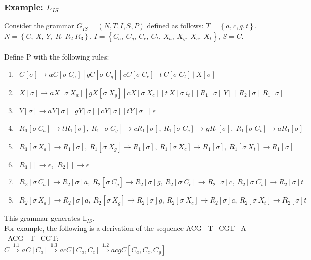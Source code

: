 \documentclass[11pt]{article}
\begin{document}
\subsubsection{Example: $L_{IS}$}
Consider the grammar $G_{IS} = (N, T, I, S, P)$ defined as follows:
$T = \left\{a,c,g,t\right\}$, $N = \left\{C, \ X, \ Y, \ R_1 \ R_2 \ R_3\right\}$, $I = \left\{C_{a}, \ C_{g}, \ C_{c}, \ C_{t}, \ X_{a}, \ X_{g}, \ X_{c}, \ X_{t}\right\}$,
$S = C$. \\ \\
Define P with the following rules:\\
\begin{enumerate}
\item $\ \ C[\sigma] \rightarrow a C[\sigma \ C_a] \ | \ g C[\sigma \ C_g] \ | \ c C[\sigma \ C_c] \ | \ t \ C[\sigma \ C_t] \ | \ X[\sigma]$
\item $\ \ X[\sigma] \rightarrow a X[\sigma \ X_a] \ | \ g X[\sigma \ X_g] \ | \ c X[\sigma \ X_c] \ | \ t \ X[\sigma \ i_t] \ | \ R_1[\sigma] \ Y[] \ R_2[\sigma] \ R_1[\sigma]$
\item $\ \ Y[\sigma] \rightarrow a Y[\sigma] \ | \ g Y[\sigma] \ | \ c Y[\sigma] \ | \ t Y[\sigma] \ | \ \epsilon$
\item $\ \ R_1[\sigma \ C_a] \rightarrow t R_1[\sigma], \ R_1[\sigma \ C_g] \rightarrow c R_1[\sigma], \ R_1[\sigma \ C_c] \rightarrow g R_1[\sigma], \ R_1[\sigma \ C_t] \rightarrow a R_1[\sigma]$
\item $\ \ R_1[\sigma \ X_a] \rightarrow R_1[\sigma], \ R_1[\sigma \ X_g] \rightarrow R_1[\sigma], \ R_1[\sigma \ X_c] \rightarrow R_1[\sigma], \ R_1[\sigma \ X_t] \rightarrow R_1[\sigma]$
\item $\ \ R_1[] \rightarrow \epsilon$, $\ R_2[] \rightarrow \epsilon$
\item $\ \ R_2[\sigma \ C_a] \rightarrow R_2[\sigma] a, \ R_2[\sigma \ C_g] \rightarrow R_2[\sigma] g, \ R_2[\sigma \ C_c] \rightarrow R_2[\sigma] c, \ R_2[\sigma \ C_t] \rightarrow R_2[\sigma] t$
\item $\ \ R_2[\sigma \ X_a] \rightarrow R_2[\sigma] a, \ R_2[\sigma \ X_g] \rightarrow R_2[\sigma] g, \ R_2[\sigma \ X_c] \rightarrow R_2[\sigma] c, \ R_2[\sigma \ X_t] \rightarrow R_2[\sigma] t$
\end{enumerate}
This grammar generates $\mathds{L}_{IS}$. \\
For example, the following is a derivation of the sequence ACG \ T \ CGT \ A \ ACG \ T \ CGT: \\
\indent$ C \ \overset{1.1}{\Rightarrow} a C[C_a] \overset{1.3}{\Rightarrow} ac C[C_a, C_c] \overset{1.2}{\Rightarrow} acg C[C_a, C_c, C_g] $ \\
\end{document}
